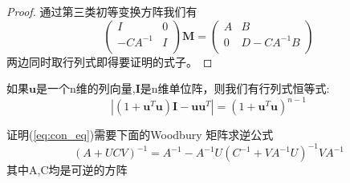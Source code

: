 \begin{proof}
通过第三类初等变换方阵我们有\[
\left(\begin{array}{cc}
I&0\\
-CA^{-1}&I\\
\end{array}\right) \bm{M}=\left(\begin{array}{cc}
A&B\\
0&D-CA^{-1}B\\
\end{array}\right)\]
两边同时取行列式即得要证明的式子。
\end{proof}
\begin{lemma}
如果$\bm{u}$是一个n维的列向量,$\bm{I}$是n维单位阵，则我们有行列式恒等式:
\begin{equation}\label{eq:con_eq}
|(1+\bm{u}^T\bm{u})\bm{I}-\bm{u}\bm{u}^T|=(1+\bm{u}^T\bm{u})^{n-1}
\end{equation}
\end{lemma}
证明(\ref{eq:con_eq})需要下面的Woodbury 矩阵求逆公式
\begin{equation}\label{eq:woodbury}
(A+UCV)^{-1}=A^{-1}-A^{-1}U(C^{-1}+VA^{-1}U)^{-1}VA^{-1}
\end{equation}
其中A,C均是可逆的方阵


